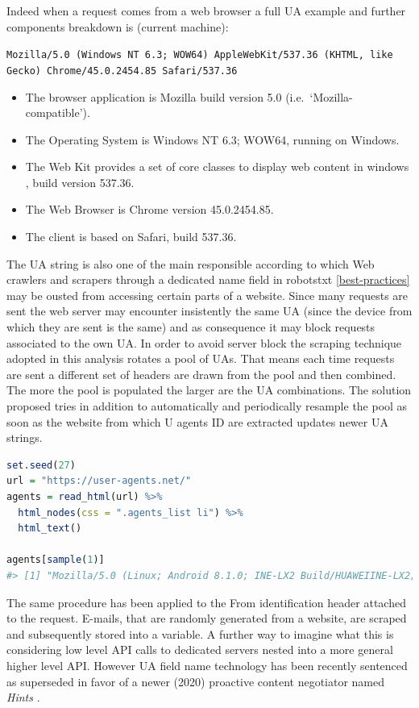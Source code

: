 \documentclass[
  12pt,
  a4paper,
  oneside]{book}
\newcommand{\passthrough}[1]{#1}
\providecommand{\tightlist}{%
  \setlength{\itemsep}{0pt}\setlength{\parskip}{0pt}}
\theoremstyle{definition}
\theoremstyle{definition}
\theoremstyle{definition}
\theoremstyle{remark}
\begin{document}
Indeed when a request comes from a web browser a full UA example and further components breakdown is (current machine):

\passthrough{\lstinline!Mozilla/5.0 (Windows NT 6.3; WOW64) AppleWebKit/537.36 (KHTML, like Gecko) Chrome/45.0.2454.85 Safari/537.36!}

\begin{itemize}
\tightlist
\item
  The browser application is Mozilla build version 5.0 (i.e.~`Mozilla-compatible').
\item
  The Operating System is Windows NT 6.3; WOW64, running on Windows.
\item
  The Web Kit provides a set of core classes to display web content in windows \citep{UserAgen23}, build version 537.36.
\item
  The Web Browser is Chrome version 45.0.2454.85.
\item
  The client is based on Safari, build 537.36.
\end{itemize}

The UA string is also one of the main responsible according to which Web crawlers and scrapers through a dedicated name field in robotstxt \ref{best-practices} may be ousted from accessing certain parts of a website. Since many requests are sent the web server may encounter insistently the same UA (since the device from which they are sent is the same) and as consequence it may block requests associated to the own UA. In order to avoid server block the scraping technique adopted in this analysis rotates a pool of UAs. That means each time requests are sent a different set of headers are drawn from the pool and then combined. The more the pool is populated the larger are the UA combinations. The solution proposed tries in addition to automatically and periodically resample the pool as soon as the website from which U agents ID are extracted updates newer UA strings.

\begin{lstlisting}[language=R]
set.seed(27)
url = "https://user-agents.net/"
agents = read_html(url) %>%
  html_nodes(css = ".agents_list li") %>% 
  html_text()

agents[sample(1)]
#> [1] "Mozilla/5.0 (Linux; Android 8.1.0; INE-LX2 Build/HUAWEIINE-LX2; wv) AppleWebKit/537.36 (KHTML, like Gecko) Version/4.0 Chrome/88.0.4324.152 Mobile Safari/537.36 [FB_IAB/FB4A;FBAV/305.1.0.40.120;]"
\end{lstlisting}

The same procedure has been applied to the From identification header attached to the request. E-mails, that are randomly generated from a website, are scraped and subsequently stored into a variable. A further way to imagine what this is considering low level API calls to dedicated servers nested into a more general higher level API.
However UA field name technology has been recently sentenced as superseded in favor of a newer (2020) proactive content negotiator named \emph{Hints} \citet{wiki:UserAgentHints}.
\end{document}
